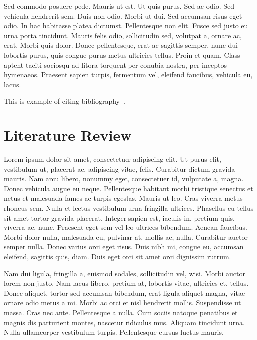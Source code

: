 \documentclass[12pt,a4paper,twoside,openright]{report}
\begin{document}
Sed commodo posuere pede. Mauris ut est. Ut quis purus. Sed ac odio. Sed vehicula hendrerit sem. Duis non odio. Morbi ut dui. Sed accumsan risus eget odio. In hac habitasse platea dictumst. Pellentesque non elit. Fusce sed justo eu urna porta tincidunt. Mauris felis odio, sollicitudin sed, volutpat a, ornare ac, erat. Morbi quis dolor. Donec pellentesque, erat ac sagittis semper, nunc dui lobortis purus, quis congue purus metus ultricies tellus. Proin et quam. Class aptent taciti sociosqu ad litora torquent per conubia nostra, per inceptos hymenaeos. Praesent sapien turpis, fermentum vel, eleifend faucibus, vehicula eu, lacus.

\vspace{1em}
This is example of citing bibliography~\cite{doe2021quantum, lee2019advances, smith2020artificial}.

\cleardoublepage


\chapter{Literature Review}
Lorem ipsum dolor sit amet, consectetuer adipiscing elit. Ut purus elit, vestibulum ut, placerat ac, adipiscing vitae, felis. Curabitur dictum gravida mauris. Nam arcu libero, nonummy eget, consectetuer id, vulputate a, magna. Donec vehicula augue eu neque. Pellentesque habitant morbi tristique senectus et netus et malesuada fames ac turpis egestas. Mauris ut leo. Cras viverra metus rhoncus sem. Nulla et lectus vestibulum urna fringilla ultrices. Phasellus eu tellus sit amet tortor gravida placerat. Integer sapien est, iaculis in, pretium quis, viverra ac, nunc. Praesent eget sem vel leo ultrices bibendum. Aenean faucibus. Morbi dolor nulla, malesuada eu, pulvinar at, mollis ac, nulla. Curabitur auctor semper nulla. Donec varius orci eget risus. Duis nibh mi, congue eu, accumsan eleifend, sagittis quis, diam. Duis eget orci sit amet orci dignissim rutrum.

Nam dui ligula, fringilla a, euismod sodales, sollicitudin vel, wisi. Morbi auctor lorem non justo. Nam lacus libero, pretium at, lobortis vitae, ultricies et, tellus. Donec aliquet, tortor sed accumsan bibendum, erat ligula aliquet magna, vitae ornare odio metus a mi. Morbi ac orci et nisl hendrerit mollis. Suspendisse ut massa. Cras nec ante. Pellentesque a nulla. Cum sociis natoque penatibus et magnis dis parturient montes, nascetur ridiculus mus. Aliquam tincidunt urna. Nulla ullamcorper vestibulum turpis. Pellentesque cursus luctus mauris.
\end{document}

